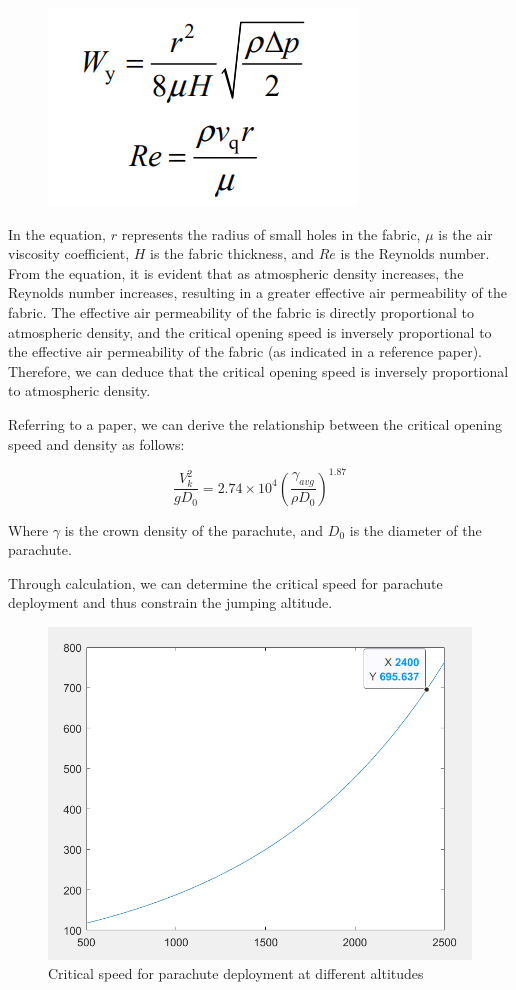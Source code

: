 \documentclass[12pt]{article}
\begin{document}
\begin{figure}[!hbtp]
    \centering 
    \includegraphics[width = 0.2\linewidth]{image/018.png}
\end{figure}

In the equation, \(r\) represents the radius of small holes in the fabric, \(\mu\) is the air viscosity coefficient, \(H\) is the fabric thickness, 
and \(Re\) is the Reynolds number. From the equation, it is evident that as atmospheric density increases, the Reynolds number increases, resulting in a greater 
effective air permeability of the fabric. The effective air permeability of the fabric is directly proportional to atmospheric density, and the critical opening 
speed is inversely proportional to the effective air permeability of the fabric (as indicated in a reference paper). Therefore, we can deduce that the critical 
opening speed is inversely proportional to atmospheric density.

Referring to a paper\cite{Sui}, we can derive the relationship between the critical opening speed and density as follows:

\[ \frac{V_k^2}{gD_0} = 2.74 \times 10^4 \left(\frac{\gamma_{avg}}{\rho D_0}\right)^{1.87} \]

Where \(\gamma\) is the crown density of the parachute, and \(D_0\) is the diameter of the parachute.

Through calculation, we can determine the critical speed for parachute deployment and thus constrain the jumping altitude.

\begin{figure}[!hbtp]
    \centering 
    \includegraphics[width = 0.4\linewidth]{image/019.png}
    \caption{Critical speed for parachute deployment at different altitudes}
\end{figure}
\end{document}
